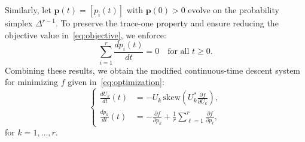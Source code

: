 \documentclass[onefignum,onetabnum]{siamart220329}
\begin{document}
    Similarly, let $\mathbf{p}(t) = [p_i(t)]$ with $\mathbf{p}(0) > 0$ evolve on the probability simplex $\Delta^{r-1}$. To preserve the trace-one property and ensure reducing the objective value in~\eqref{eq:objective}, we enforce:
    \begin{equation}\label{eq:sumto1}
    \sum_{i=1}^r \frac{d p_i(t)}{dt} = 0 \quad \text{for all } t \geq 0.
    \end{equation}
    Combining these results, we obtain the modified continuous-time descent system for minimizing $f$ given in~\eqref{eq:optimization}:
    \begin{equation} \label{eq:dyflow}
    \left \{
    \begin{aligned}
        \frac{dU_k}{dt}(t) &= -U_k \, \mathrm{skew}\left(U_k^* \frac{\partial f}{\partial U_k}\right), \\ 
        \frac{dp_k}{dt}(t) &= -\frac{\partial f}{\partial p_k} + \frac{1}{r} \sum_{\ell=1}^r \frac{\partial f}{\partial p_\ell},
    \end{aligned}
    \right .
    \end{equation}
    for $k = 1, \ldots, r$. 
    
\end{document}
